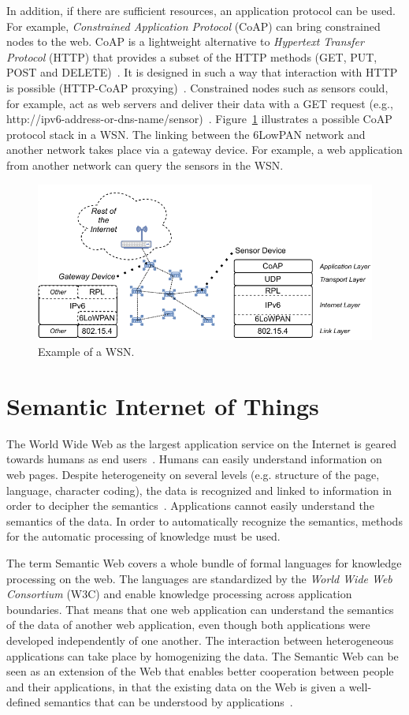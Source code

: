 \documentclass[english,version-2019-11]{uzl-thesis}
\begin{document}
In addition, if there are sufficient resources, an application protocol can be used. For example, \emph{Constrained Application Protocol} (CoAP) can bring constrained nodes to the web. CoAP is a lightweight alternative to \emph{Hypertext Transfer Protocol} (HTTP) that provides a subset of the HTTP methods (GET, PUT, POST and DELETE)~\cite{SemanticModels}. It is designed in such a way that interaction with HTTP is possible (HTTP-CoAP proxying)~\cite{rfc7252}. Constrained nodes such as sensors could, for example, act as web servers and deliver their data with a GET request (e.g., http://ipv6-address-or-dns-name/sensor)~\cite{SemanticModels}. Figure~\ref{figure_wsn} illustrates a possible CoAP protocol stack in a WSN. The linking between the 6LowPAN network and another network takes place via a gateway device. For example, a web application from another network can query the sensors in the WSN.
\begin{figure}[htpb]
  \centering
  \includegraphics{figure_wsn.pdf}
  \caption{Example of a WSN.}
  \label{figure_wsn}
\end{figure}


\section{Semantic Internet of Things}
The World Wide Web as the largest application service on the Internet is geared towards humans as end users~\cite{SWPaper}. Humans can easily understand information on web pages. Despite heterogeneity on several levels (e.g. structure of the page, language, character coding), the data is recognized and linked to information in order to decipher the semantics~\cite{SWBookHitzler}. Applications cannot easily understand the semantics of the data.
In order to automatically recognize the semantics, methods for the automatic processing of knowledge must be used.

The term Semantic Web covers a whole bundle of formal languages for knowledge processing on the web. The languages are standardized by the \emph{World Wide Web Consortium} (W3C) and enable knowledge processing across application boundaries. That means that one web application can understand the semantics of the data of another web application, even though both applications were developed independently of one another. The interaction between heterogeneous applications can take place by homogenizing the data. The Semantic Web can be seen as an extension of the Web that enables better cooperation between people and their applications, in that the existing data on the Web is given a well-defined semantics that can be understood by applications~\cite{SWPaper}.
\end{document}
